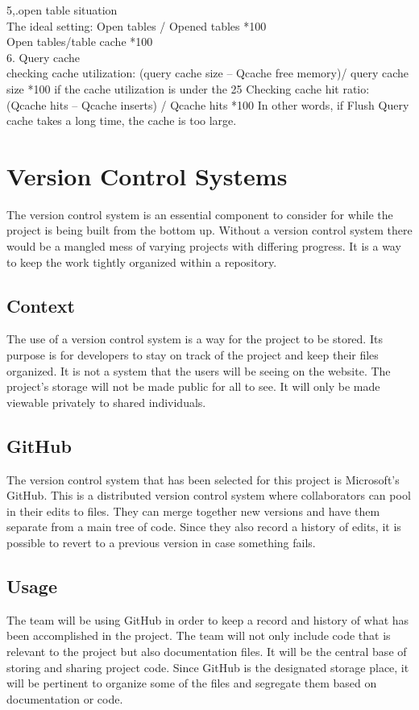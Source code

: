 \documentclass[onecolumn, draftclsnofoot,10pt, compsoc]{IEEEtran}
\begin{document}
5,.open table situation\\
The ideal setting: Open tables / Opened tables *100\\%
               Open tables/table cache *100\\%
6. Query cache\\
checking cache utilization: (query cache size – Qcache free memory)/ query cache size *100%
if the cache utilization is under the 25%
Checking cache hit ratio: (Qcache hits – Qcache inserts) / Qcache hits *100%
In other words, if Flush Query cache takes a long time, the cache is too large. 




\section{Version Control Systems}
The version control system is an essential component to consider for while the project is being built from the bottom up. Without a version control system there would be a mangled mess of varying projects with differing progress. It is a way to keep the work tightly organized within a repository.

\subsection{Context}
The use of a version control system is a way for the project to be stored. Its purpose is for developers to stay on track of the project and keep their files organized. It is not a system that the users will be seeing on the website. The project's storage will not be made public for all to see. It will only be made viewable privately to shared individuals.

\subsection{GitHub}
The version control system that has been selected for this project is Microsoft’s GitHub. This is a distributed version control system where collaborators can pool in their edits to files. They can merge together new versions and have them separate from a main tree of code. Since they also record a history of edits, it is possible to revert to a previous version in case something fails.

\subsection{Usage}
The team will be using GitHub in order to keep a record and history of what has been accomplished in the project. The team will not only include code that is relevant to the project but also documentation files. It will be the central base of storing and sharing project code. Since GitHub is the designated storage place, it will be pertinent to organize some of the files and segregate them based on documentation or code.
\end{document}
